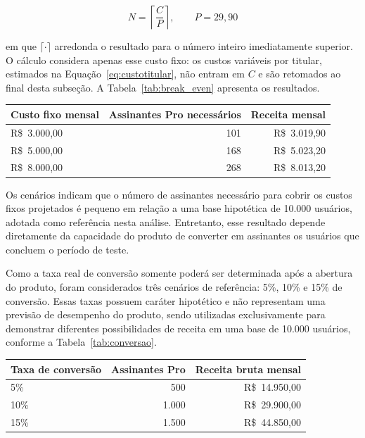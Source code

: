 \begin{equation}
N = \left\lceil \frac{C}{P} \right\rceil, \qquad P = 29{,}90
\label{eq:equilibrio}
\end{equation}

\noindent em que $\lceil \cdot \rceil$ arredonda o resultado para o número inteiro imediatamente superior. O cálculo considera apenas esse custo fixo: os custos variáveis por titular, estimados na Equação~\ref{eq:custotitular}, não entram em $C$ e são retomados ao final desta subseção. A Tabela~\ref{tab:break_even} apresenta os resultados.

\begin{tabela}[H]
\centering
\caption{Análise de sensibilidade do ponto de equilíbrio}
\label{tab:break_even}
\begin{tabular}{lrr}
\toprule
\textbf{Custo fixo mensal} & \textbf{Assinantes Pro necessários} & \textbf{Receita mensal} \\
\midrule
R\$~3.000,00 & 101 & R\$~3.019,90 \\
R\$~5.000,00 & 168 & R\$~5.023,20 \\
R\$~8.000,00 & 268 & R\$~8.013,20 \\
\bottomrule
\end{tabular}
\authorssource
\end{tabela}

Os cenários indicam que o número de assinantes necessário para cobrir os custos fixos projetados é pequeno em relação a uma base hipotética de 10.000 usuários, adotada como referência nesta análise. Entretanto, esse resultado depende diretamente da capacidade do produto de converter em assinantes os usuários que concluem o período de teste.

Como a taxa real de conversão somente poderá ser determinada após a abertura do produto, foram considerados três cenários de referência: 5\%, 10\% e 15\% de conversão. Essas taxas possuem caráter hipotético e não representam uma previsão de desempenho do produto, sendo utilizadas exclusivamente para demonstrar diferentes possibilidades de receita em uma base de 10.000 usuários, conforme a Tabela~\ref{tab:conversao}.

\begin{tabela}[H]
\centering
\caption{Cenários de conversão para uma base de 10.000 usuários}
\label{tab:conversao}
\begin{tabular}{lrr}
\toprule
\textbf{Taxa de conversão} & \textbf{Assinantes Pro} & \textbf{Receita bruta mensal} \\
\midrule
5\% & 500 & R\$~14.950,00 \\
10\% & 1.000 & R\$~29.900,00 \\
15\% & 1.500 & R\$~44.850,00 \\
\bottomrule
\end{tabular}
\authorssource
\end{tabela}

